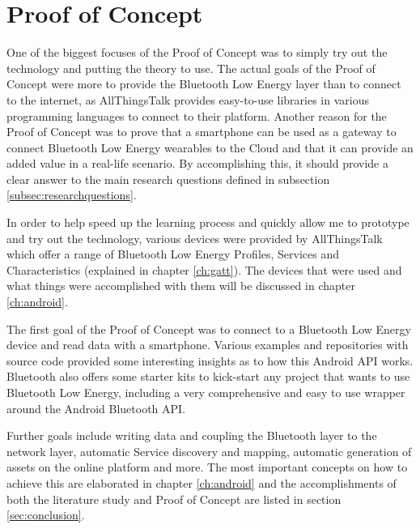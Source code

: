 \documentclass[pdftex,a4paper,12pt,twoside]{report}
\begin{document}
\section{Proof of Concept}
\label{sec:poc}
One of the biggest focuses of the Proof of Concept was to simply try out the technology and putting the theory to use. The actual goals of the Proof of Concept were more to provide the Bluetooth Low Energy layer than to connect to the internet, as AllThingsTalk provides easy-to-use libraries in various programming languages to connect to their platform. Another reason for the Proof of Concept was to prove that a smartphone can be used as a gateway to connect Bluetooth Low Energy wearables to the Cloud and that it can provide an added value in a real-life scenario. By accomplishing this, it should provide a clear answer to the main research questions defined in subsection \ref{subsec:researchquestions}.

In order to help speed up the learning process and quickly allow me to prototype and try out the technology, various devices were provided by AllThingsTalk which offer a range of Bluetooth Low Energy Profiles, Services and Characteristics (explained in chapter \ref{ch:gatt}). The devices that were used and what things were accomplished with them will be discussed in chapter \ref{ch:android}.

The first goal of the Proof of Concept was to connect to a Bluetooth Low Energy device and read data with a smartphone. Various examples and repositories with source code provided some interesting insights as to how this Android API works. Bluetooth also offers some starter kits to kick-start any project that wants to use Bluetooth Low Energy, including a very comprehensive and easy to use wrapper around the Android Bluetooth API.

Further goals include writing data and coupling the Bluetooth layer to the network layer, automatic Service discovery and mapping, automatic generation of assets on the online platform and more. The most important concepts on how to achieve this are elaborated in chapter \ref{ch:android} and the accomplishments of both the literature study and Proof of Concept are listed in section \ref{sec:conclusion}.


\end{document}
